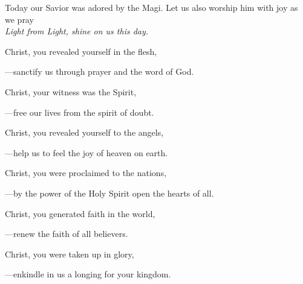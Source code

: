 \intercessions\indent

\begin{hangpar}

Today our Savior was adored by the Magi. Let us also worship him with joy as we pray\\
\emph{Light from Light, shine on us this day.}

\medskip Christ, you revealed yourself in the flesh,

{\color{red}---\thinspace}sanctify us through prayer and the word of God.

\medskip Christ, your witness was the Spirit,

{\color{red}---\thinspace}free our lives from the spirit of doubt.

\medskip Christ, you revealed yourself to the angels,

{\color{red}---\thinspace}help us to feel the joy of heaven on earth.

\medskip Christ, you were proclaimed to the nations,

{\color{red}---\thinspace}by the power of the Holy Spirit open the hearts of all.

\medskip Christ, you generated faith in the world,

{\color{red}---\thinspace}renew the faith of all believers.

\medskip Christ, you were taken up in glory,

{\color{red}---\thinspace}enkindle in us a longing for your kingdom.

\medskip

\end{hangpar}